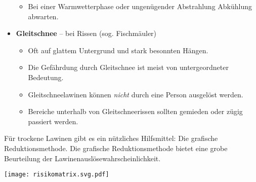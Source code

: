 \begin{itemize}
{\begin{itemize}
      \item{Bei einer Warmwetterphase oder ungenügender Abstrahlung Abkühlung abwarten.}
    \end{itemize}
  }
  \item{
    \textbf{Gleitschnee} -- bei Rissen (sog. Fischmäuler)
    \begin{itemize}
      \item{Oft auf glattem Untergrund und stark besonnten Hängen.}
      \item{Die Gefährdung durch Gleitschnee ist meist von untergeordneter Bedeutung.}
      \item{Gleitschneelawinen können \textit{nicht} durch eine Person ausgelöst werden.}
      \item{Bereiche unterhalb von Gleitschneerissen sollten gemieden oder zügig passiert werden.}
    \end{itemize}
  }
\end{itemize}

\newcolumn

Für trockene Lawinen gibt es ein nützliches Hilfsmittel: Die grafische Reduktionsmethode.
Die grafische Reduktionsmethode bietet eine grobe Beurteilung der Lawinenauslösewahrscheinlichkeit.

\begin{center}
  \texttt{[image: risikomatrix.svg.pdf]}
\end{center}

\newcolumn